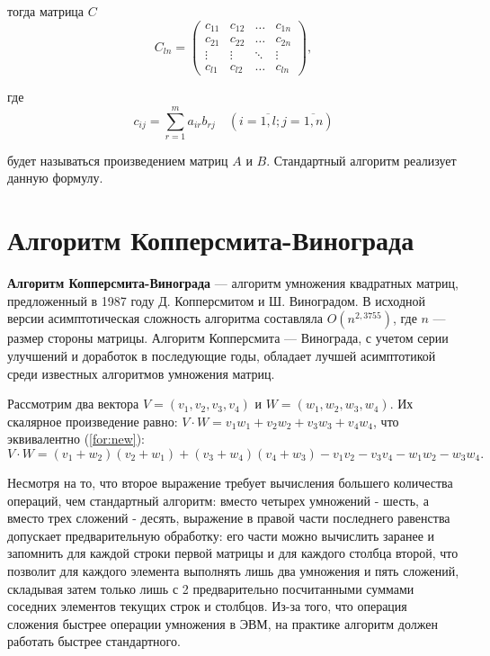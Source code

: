 \documentclass[a4paper,14pt, unknownkeysallowed]{extreport}
\begin{document}
тогда матрица $C$
\begin{equation}
	C_{ln} = \begin{pmatrix}
		c_{11} & c_{12} & \ldots & c_{1n}\\
		c_{21} & c_{22} & \ldots & c_{2n}\\
		\vdots & \vdots & \ddots & \vdots\\
		c_{l1} & c_{l2} & \ldots & c_{ln}
	\end{pmatrix},
\end{equation}

где
\begin{equation}
	\label{eq:M}
	c_{ij} =
	\sum_{r=1}^{m} a_{ir}b_{rj} \quad (i=\overline{1,l}; j=\overline{1,n})
\end{equation}

будет называться произведением матриц $A$ и $B$. Стандартный алгоритм реализует данную формулу.

\section{Алгоритм Копперсмита-Винограда}

\textbf{Алгоритм Копперсмита-Винограда} — алгоритм умножения квадратных матриц, предложенный в 1987 году Д. Копперсмитом и Ш. Виноградом.
В исходной версии асимптотическая сложность алгоритма составляла $O(n^{2,3755})$, где  $n$ — размер стороны матрицы.
Алгоритм Копперсмита — Винограда, с учетом серии улучшений и доработок в последующие годы, обладает лучшей асимптотикой среди известных алгоритмов умножения матриц.


Рассмотрим два вектора $V = (v_1, v_2, v_3, v_4)$ и $W = (w_1, w_2, w_3, w_4)$.
Их скалярное произведение равно: $V \cdot W = v_1w_1 + v_2w_2 + v_3w_3 + v_4w_4$, что эквивалентно (\ref{for:new}):
\begin{equation}
	\label{for:new}
	V \cdot W = (v_1 + w_2)(v_2 + w_1) + (v_3 + w_4)(v_4 + w_3) - v_1v_2 - v_3v_4 - w_1w_2 - w_3w_4.
\end{equation}

Несмотря на то, что второе выражение требует вычисления большего количества операций, чем стандартный алгоритм: вместо четырех умножений - шесть, а вместо трех сложений - десять, выражение в правой части последнего равенства допускает предварительную обработку: его части можно вычислить заранее и запомнить для каждой строки первой матрицы и для каждого столбца второй, что позволит для каждого элемента выполнять лишь два умножения и пять сложений, складывая затем только лишь с 2 предварительно посчитанными суммами соседних элементов текущих строк и столбцов.
Из-за того, что операция сложения быстрее операции умножения в ЭВМ, на практике алгоритм должен работать быстрее стандартного.
\end{document}

